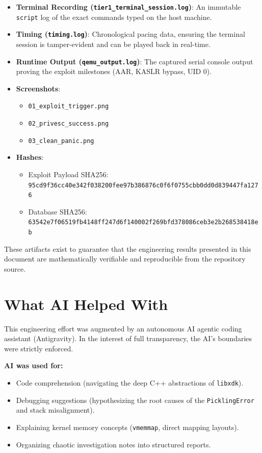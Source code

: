 \documentclass[11pt,a4paper]{article}
\begin{document}
\begin{itemize}
    \item \textbf{Terminal Recording (\texttt{tier1\_terminal\_session.log})}: An immutable \texttt{script} log of the exact commands typed on the host machine.
    \item \textbf{Timing (\texttt{timing.log})}: Chronological pacing data, ensuring the terminal session is tamper-evident and can be played back in real-time.
    \item \textbf{Runtime Output (\texttt{qemu\_output.log})}: The captured serial console output proving the exploit milestones (AAR, KASLR bypass, UID 0).
    \item \textbf{Screenshots}: 
    \begin{itemize}
        \item \texttt{01\_exploit\_trigger.png}
        \item \texttt{02\_privesc\_success.png}
        \item \texttt{03\_clean\_panic.png}
    \end{itemize}
    \item \textbf{Hashes}:
    \begin{itemize}
        \item Exploit Payload SHA256: \texttt{95cd9f36cc40e342f038200fee97b386876c0f6f0755cbb0dd0d839447fa1276}
        \item Database SHA256: \texttt{63542e7f06519fb4148ff247d6f140002f269bfd378086ceb3e2b268538418eb}
    \end{itemize}
\end{itemize}

These artifacts exist to guarantee that the engineering results presented in this document are mathematically verifiable and reproducible from the repository source.

\clearpage

\section{What AI Helped With}
This engineering effort was augmented by an autonomous AI agentic coding assistant (Antigravity). In the interest of full transparency, the AI's boundaries were strictly enforced.

\textbf{AI was used for:}
\begin{itemize}
    \item Code comprehension (navigating the deep C++ abstractions of \texttt{libxdk}).
    \item Debugging suggestions (hypothesizing the root causes of the \texttt{PicklingError} and stack misalignment).
    \item Explaining kernel memory concepts (\texttt{vmemmap}, direct mapping layouts).
    \item Organizing chaotic investigation notes into structured reports.
\end{itemize}
\end{document}
